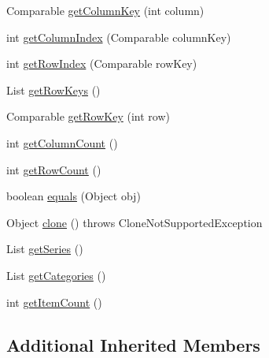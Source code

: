 \begin{DoxyCompactItemize}
\item 
Comparable \mbox{\hyperlink{classorg_1_1jfree_1_1data_1_1category_1_1_default_interval_category_dataset_a522cac1ea57092736c3a2212e97e56b9}{get\+Column\+Key}} (int column)
\item 
int \mbox{\hyperlink{classorg_1_1jfree_1_1data_1_1category_1_1_default_interval_category_dataset_aa081b358d8813325db79019dafaa2c62}{get\+Column\+Index}} (Comparable column\+Key)
\item 
int \mbox{\hyperlink{classorg_1_1jfree_1_1data_1_1category_1_1_default_interval_category_dataset_afba38bccf1dff83c9346fec2dad6aa69}{get\+Row\+Index}} (Comparable row\+Key)
\item 
List \mbox{\hyperlink{classorg_1_1jfree_1_1data_1_1category_1_1_default_interval_category_dataset_aa8a0a871f4557e0ef292fe5e9db0d55b}{get\+Row\+Keys}} ()
\item 
Comparable \mbox{\hyperlink{classorg_1_1jfree_1_1data_1_1category_1_1_default_interval_category_dataset_a43d43fb85d81f77ce7737d381c91b8b3}{get\+Row\+Key}} (int row)
\item 
int \mbox{\hyperlink{classorg_1_1jfree_1_1data_1_1category_1_1_default_interval_category_dataset_a6c5f88da1428294d43e58d41fdf81992}{get\+Column\+Count}} ()
\item 
int \mbox{\hyperlink{classorg_1_1jfree_1_1data_1_1category_1_1_default_interval_category_dataset_af827538c915c040aac83c23bc980b0f5}{get\+Row\+Count}} ()
\item 
boolean \mbox{\hyperlink{classorg_1_1jfree_1_1data_1_1category_1_1_default_interval_category_dataset_a0b5d4e74b2c9bd534fb59bce982095a3}{equals}} (Object obj)
\item 
Object \mbox{\hyperlink{classorg_1_1jfree_1_1data_1_1category_1_1_default_interval_category_dataset_aaf7c3cdf8fd3c30738dc1a5e22824043}{clone}} ()  throws Clone\+Not\+Supported\+Exception 
\item 
List \mbox{\hyperlink{classorg_1_1jfree_1_1data_1_1category_1_1_default_interval_category_dataset_a7e8cc76c4ac97fbf13459f1343ac5d91}{get\+Series}} ()
\item 
List \mbox{\hyperlink{classorg_1_1jfree_1_1data_1_1category_1_1_default_interval_category_dataset_abd3e0af9301697643c6e2fdde8765c57}{get\+Categories}} ()
\item 
int \mbox{\hyperlink{classorg_1_1jfree_1_1data_1_1category_1_1_default_interval_category_dataset_a565a96d7e8d9e7dee48ce40be982a54a}{get\+Item\+Count}} ()
\end{DoxyCompactItemize}
\subsection*{Additional Inherited Members}


